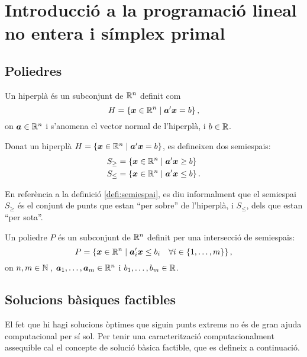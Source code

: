 \chapter[Introducció a la prog. lineal \& símplex primal]%
{Introducció a la programació lineal no entera i símplex primal}

\section{Poliedres}
\begin{defi}[Hiperplà]\label{defi:hiperpla}
	Un hiperplà és un subconjunt de $\mathbb{R}^n$ definit com \[H = \{\boldsymbol{x}\in\mathbb{R}^n \mid \boldsymbol{a}'\boldsymbol{x}=b \}\,, \] on $\boldsymbol{a}\in\mathbb{R}^n$ i s'anomena el vector normal de l'hiperplà, i $b\in\mathbb{R}$.
\end{defi}

\begin{defi}[Semiespai]\label{defi:semiespai}
	Donat un hiperplà $H = \{\boldsymbol{x}\in\mathbb{R}^n \mid \boldsymbol{a}'\boldsymbol{x}=b \}$, es defineixen dos semiespais: 
	\begin{align*}
		S_{\ge} &= \{\boldsymbol{x}\in\mathbb{R}^n \mid \boldsymbol{a}'\boldsymbol{x} \ge b \}\\
		S_{\le} &= \{\boldsymbol{x}\in\mathbb{R}^n \mid \boldsymbol{a}'\boldsymbol{x} \le b \}\,.
	\end{align*}
\end{defi}

En referència a la definició \ref{defi:semiespai}, es diu informalment que el semiespai $S_\ge$ és el conjunt de punts que estan ``per sobre'' de l'hiperplà, i $S_\le$, dels que estan ``per sota''.

\begin{defi}[Poliedre]\label{defi:poliedre}
	Un poliedre $P$ és un subconjunt de $\mathbb{R}^n$ definit per una intersecció de semiespais: \[P = \{\boldsymbol{x}\in\mathbb{R}^n \mid \boldsymbol{a}_i'\boldsymbol{x} \le b_i \quad \forall i\in \{1,\ldots,m\} \}\,,\] on $n,m\in\mathbb{N}\,$, $\boldsymbol{a}_1,\ldots,\boldsymbol{a}_m \in \mathbb{R}^n$ i $b_1,\ldots,b_m\in\mathbb{R}$.
\end{defi}

\section{Solucions bàsiques factibles}

El fet que hi hagi solucions òptimes que siguin punts extrems no és de gran ajuda computacional per sí sol. Per tenir una caracterització computacionalment assequible cal el concepte de solució bàsica factible, que es defineix a continuació.

